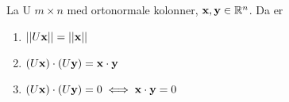 La U $m\times n$ med ortonormale kolonner, $\mathbf{x},\mathbf{y}\in\mathbb{R}^n$.
Da er
\begin{enumerate}
  \item $||U\mathbf{x}|| = ||\mathbf{x}||$
  \item $(U\mathbf{x})\cdot(U\mathbf{y}) = \mathbf{x}\cdot\mathbf{y}$
  \item $(U\mathbf{x})\cdot(U\mathbf{y})=0 \iff \mathbf{x}\cdot\mathbf{y}=0$
\end{enumerate}
